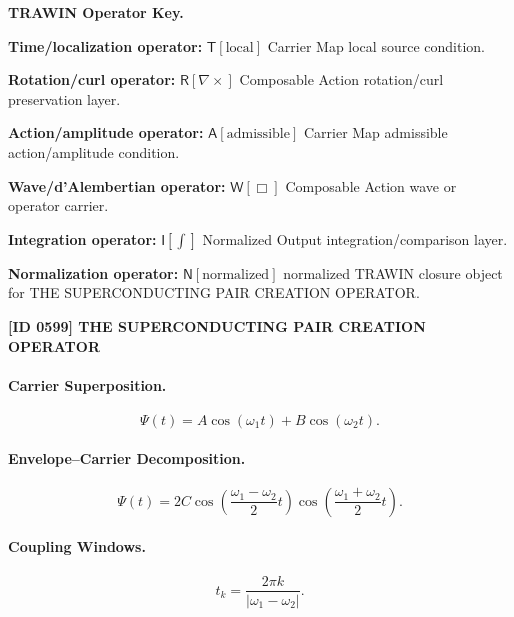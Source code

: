 \par\vspace{0.45\baselineskip}
\noindent\begin{minipage}[t]{\linewidth}
\begingroup
\small
\raggedright
\textbf{TRAWIN Operator Key.}\par
\noindent\textbf{Time/localization operator:} $\mathsf{T}\!\left[\mathrm{local}\right]$ Carrier Map local source condition.\par
\noindent\textbf{Rotation/curl operator:} $\mathsf{R}\!\left[\nabla\times\right]$ Composable Action rotation/curl preservation layer.\par
\noindent\textbf{Action/amplitude operator:} $\mathsf{A}\!\left[\mathrm{admissible}\right]$ Carrier Map admissible action/amplitude condition.\par
\noindent\textbf{Wave/d'Alembertian operator:} $\mathsf{W}\!\left[\Box\right]$ Composable Action wave or operator carrier.\par
\noindent\textbf{Integration operator:} $\mathsf{I}\!\left[\int\right]$ Normalized Output integration/comparison layer.\par
\noindent\textbf{Normalization operator:} $\mathsf{N}\!\left[\mathrm{normalized}\right]$ normalized TRAWIN closure object for THE SUPERCONDUCTING PAIR CREATION OPERATOR.\par
\endgroup
\end{minipage}

\clearpage
\noindent\textbf{[ID 0599] THE SUPERCONDUCTING PAIR CREATION OPERATOR}\par
\vspace{0.35em}
\paragraph{Carrier Superposition.}
\begin{equation}
\Psi(t)=A\cos(\omega_1t)+B\cos(\omega_2t).
\end{equation}

\paragraph{Envelope--Carrier Decomposition.}
\begin{equation}
\Psi(t)
=
2C
\cos\left(
\frac{\omega_1-\omega_2}{2}t
\right)
\cos\left(
\frac{\omega_1+\omega_2}{2}t
\right).
\end{equation}

\paragraph{Coupling Windows.}
\begin{equation}
t_k=
\frac{2\pi k}{|\omega_1-\omega_2|}.
\end{equation}

